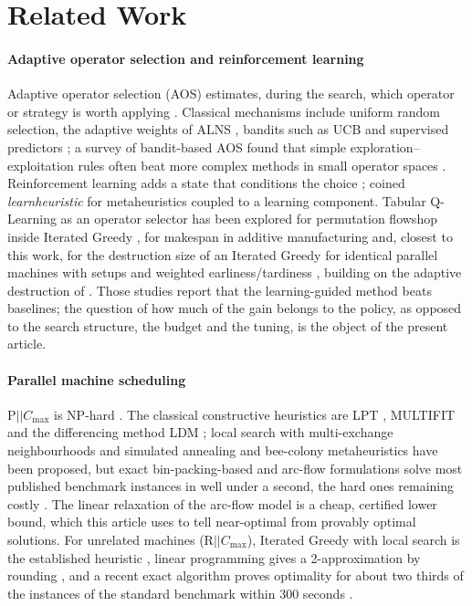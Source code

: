 \section{Related Work}
\label{sec:related}

\paragraph{Adaptive operator selection and reinforcement learning}
Adaptive operator selection (AOS) estimates, during the search, which operator or strategy is worth applying \citep{FialhoEtal2010,BurkeEtal2013}. Classical mechanisms include uniform
random selection, the adaptive weights of ALNS \citep{PisingerRopke2007}, bandits such as UCB \citep{AuerEtal2002} and supervised predictors \citep{MaturanaSaubion2008}; a survey
of bandit-based AOS found that simple exploration--exploitation rules often beat more complex methods in small operator spaces \citep{FialhoEtal2010}. Reinforcement learning adds a state
that conditions the choice \citep{BengioBengio2021}; \citet{CalvetEtal2017} coined \emph{learnheuristic} for metaheuristics coupled to a learning component. Tabular Q-Learning as an operator
selector has been explored for permutation flowshop inside Iterated Greedy \citep{KarimiMamaghanEtal2023,KarimiMamaghanEtal2024}, for makespan in additive manufacturing
\citep{AlicastroEtal2021} and, closest to this work, for the destruction size of an Iterated Greedy for identical parallel machines with setups and weighted earliness/tardiness
\citep{MissaouiOSullivan2026}, building on the adaptive destruction of \citet{MissaouiRuiz2022}. Those studies report that the learning-guided method beats baselines; the question of how much
of the gain belongs to the policy, as opposed to the search structure, the budget and the tuning, is the object of the present article.

\paragraph{Parallel machine scheduling}
P$||C_{\max}$ is NP-hard \citep{GareyJohnson1979}. The classical constructive heuristics are LPT \citep{Graham1969}, MULTIFIT \citep{CoffmanGareyJohnson1978} and the
differencing method LDM \citep{KarmarkarKarp1983,MichielsEtal2007}; local search with multi-exchange neighbourhoods \citep{FrangioniEtal2004} and simulated annealing \citep{LiPerkins2024}
and bee-colony \citep{DavidovicEtal2012} metaheuristics have been proposed, but exact bin-packing-based and arc-flow formulations
\citep{DellAmicoEtal2008,MradSouayah2018,GharbiBamatraf2022,AkramEtal2024} solve most published benchmark instances in well under a second, the hard ones remaining costly
\citep{OstojicEtAl2025}. The linear relaxation of the arc-flow model is a cheap, certified lower bound, which this article uses to tell near-optimal from provably optimal solutions. For
unrelated machines (R$||C_{\max}$), Iterated Greedy with local search is the established heuristic \citep{FanjulPeyroRuiz2010}, linear programming gives a 2-approximation by rounding \citep{LenstraEtal1990}, and a recent exact algorithm proves optimality for about two thirds of the instances of the standard benchmark within 300 seconds \citep{AbladEtAl2021}.

